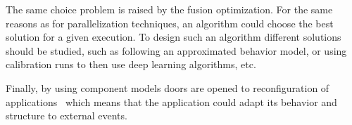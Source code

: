 The same choice problem is raised by the fusion optimization. For the same reasons as for parallelization techniques, an algorithm could choose the best solution for a given execution. To design such an algorithm different solutions should be studied, such as following an approximated behavior model, or using calibration runs to then use deep learning algorithms, etc.

Finally, by using component models doors are opened to reconfiguration of applications~\cite{Lanore:2015:RCM:2737166.2737169} which means that the application could adapt its behavior and structure to external events.
